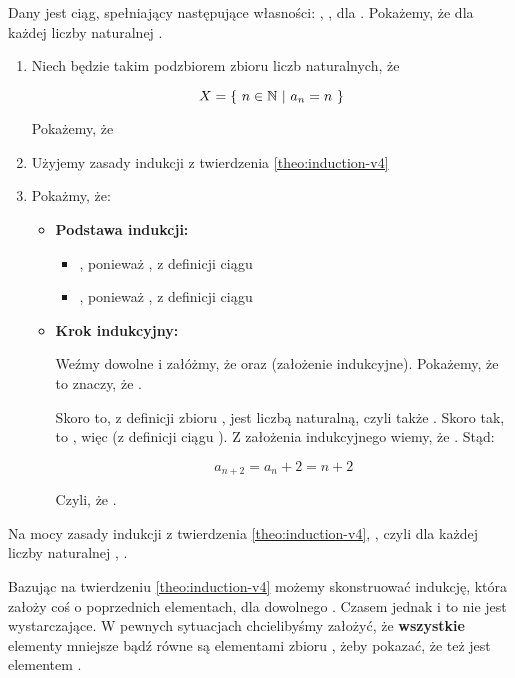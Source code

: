 \begin{example}
Dany jest ciąg, spełniający następujące własności: , ,  dla . Pokażemy, że  dla każdej liczby naturalnej .

\begin{enumerate}
    \item Niech  będzie takim podzbiorem zbioru liczb naturalnych, że
    
    \[
        X = \{\ n \in \mathbb{N}\ |\ a_n = n\ \}
    \]
    
    Pokażemy, że 
    \item Użyjemy zasady indukcji z twierdzenia \ref{theo:induction-v4}
    
    \item Pokażmy, że:
    \begin{itemize}
        \item \textbf{Podstawa indukcji:}
        \begin{itemize}
            \item {}, ponieważ , z definicji ciągu
            \item {}, ponieważ , z definicji ciągu
        \end{itemize}
        
        \item \textbf{Krok indukcyjny:}
        
        Weźmy dowolne  i załóżmy, że  oraz  (założenie indukcyjne). Pokażemy, że  to znaczy, że .
        
        Skoro  to, z definicji zbioru ,  jest liczbą naturalną, czyli także . Skoro tak, to , więc  (z definicji ciągu ). 
        Z założenia indukcyjnego wiemy, że . Stąd:
        
        \[
            a_{n+2} = a_n + 2 = n + 2
        \]
        
        Czyli, że .
    \end{itemize}
\end{enumerate}
Na mocy zasady indukcji z twierdzenia \ref{theo:induction-v4}, , czyli dla każdej liczby naturalnej , .
\end{example}

Bazując na twierdzeniu \ref{theo:induction-v4} możemy skonstruować indukcję, która założy coś o  poprzednich elementach, dla dowolnego . Czasem jednak i to nie jest wystarczające. W pewnych sytuacjach chcielibyśmy założyć, że \textbf{wszystkie} elementy mniejsze bądź równe  są elementami zbioru , żeby pokazać, że  też jest elementem . 

